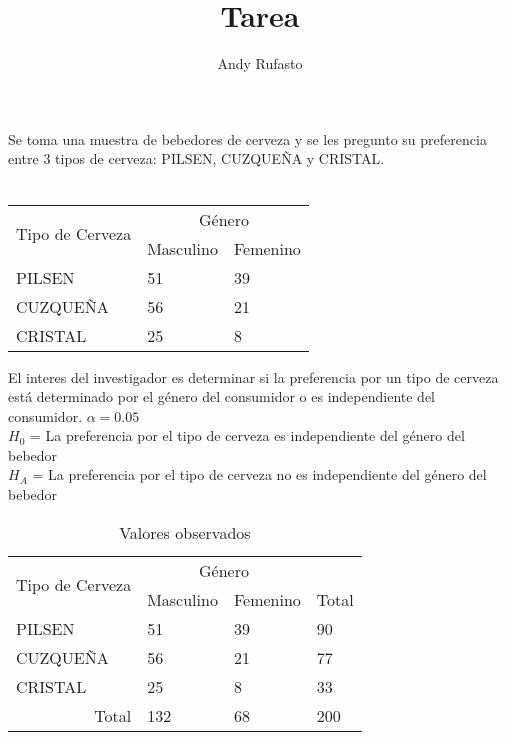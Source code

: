 \documentclass{article}
\title{Tarea}
\date{}
\author{Andy Rufasto}
\begin{document}
\maketitle
Se toma una muestra de bebedores de cerveza y se les pregunto su preferencia entre 3 tipos de cerveza: PILSEN, CUZQUEÑA y CRISTAL.\\
\\
\begin{table}[h]
\center
\begin{tabular}{|l|l|l|}
\hline
\multirow{2}{*}{Tipo de Cerveza} & \multicolumn{2}{c|}{Género} \\ \cline{2-3} 
                                 & Masculino     & Femenino    \\ \hline \hline
PILSEN                           & 51            & 39          \\ \hline
CUZQUEÑA                         & 56            & 21          \\ \hline
CRISTAL                          & 25            & 8           \\ \hline
\end{tabular}
\end{table}

\begin{flushleft}
El interes del investigador es determinar si la preferencia por un tipo de cerveza está determinado por el género del consumidor o es independiente del consumidor. $\alpha = 0.05$\\

$H_0$ = La preferencia por el tipo de cerveza es independiente del género del bebedor\\
$H_A$ = La preferencia por el tipo de cerveza no es independiente del género del bebedor\\

\end{flushleft}

\begin{table}[h]
\centering
\begin{tabular}{|l|l|l||l|}
\hline
\multirow{2}{*}{Tipo de Cerveza} & \multicolumn{2}{c|}{Género} &       \\ \cline{2-4} 
                                 & Masculino     & Femenino    & Total \\ \hline \hline
PILSEN                           & 51            & 39          & 90    \\ \hline
CUZQUEÑA                         & 56            & 21          & 77    \\ \hline
CRISTAL                          & 25            & 8           & 33    \\ \hline \hline
\multicolumn{1}{|r|}{Total}      & 132           & 68          & 200   \\ \hline
\end{tabular}
\caption{Valores observados}
\end{table}
\end{document}
